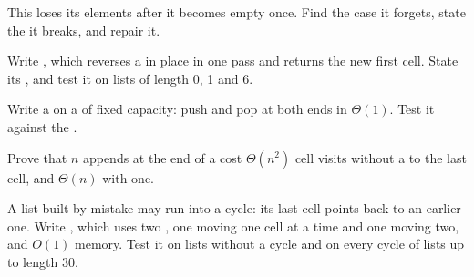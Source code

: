 \begin{exercise}[$\star\star$]\label{exo:b1:linked-structures:6}
This  loses its elements after it becomes empty once. Find the case it forgets, state the  it breaks, and repair it.
\end{exercise}

\begin{exercise}[$\star\star$]\label{exo:b1:linked-structures:7}
Write , which reverses a  in place in one pass and returns the new first cell.
State its , and test it on lists of length 0, 1 and 6.
\end{exercise}

\begin{exercise}[$\star\star$]\label{exo:b1:linked-structures:8}
Write a  on a  of fixed capacity: push and pop at both ends in $\Theta(1)$. Test it against the
.
\end{exercise}

\begin{exercise}[$\star\star$]\label{exo:b1:linked-structures:9}
Prove that $n$ appends at the end of a  cost $\Theta(n^2)$ cell visits without a  to the last
cell, and $\Theta(n)$ with one.
\end{exercise}

\begin{exercise}[$\star\star\star$]\label{exo:b1:linked-structures:10}
A list built by mistake may run into a cycle: its last cell points back to an earlier one. Write ,
which uses two , one moving one cell at a time and one moving two, and $O(1)$ memory. Test it on lists without
a cycle and on every cycle of lists up to length 30.
\end{exercise}

